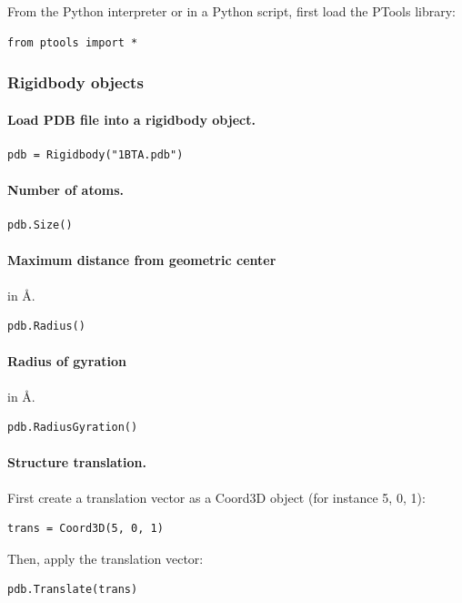 \documentclass[12pt,a4paper]{article}
\begin{document}
From the Python interpreter or in a Python script, first load the PTools library:
\begin{verbatim}
from ptools import *
\end{verbatim}


\subsubsection{Rigidbody objects}

\paragraph{Load PDB file into a rigidbody object.}
\begin{verbatim}
pdb = Rigidbody("1BTA.pdb")
\end{verbatim}

\paragraph{Number of atoms.}
\begin{verbatim}
pdb.Size()
\end{verbatim}

\paragraph{Maximum distance from geometric center} in \AA.
\begin{verbatim}
pdb.Radius()
\end{verbatim}

\paragraph{Radius of gyration} in \AA.
\begin{verbatim}
pdb.RadiusGyration()
\end{verbatim}


\paragraph{Structure translation.}
First create a translation vector as a Coord3D object (for instance 5, 0, 1):
\begin{verbatim}
trans = Coord3D(5, 0, 1)
\end{verbatim}
Then, apply the translation vector:
\begin{verbatim}
pdb.Translate(trans)
\end{verbatim}
\end{document}
